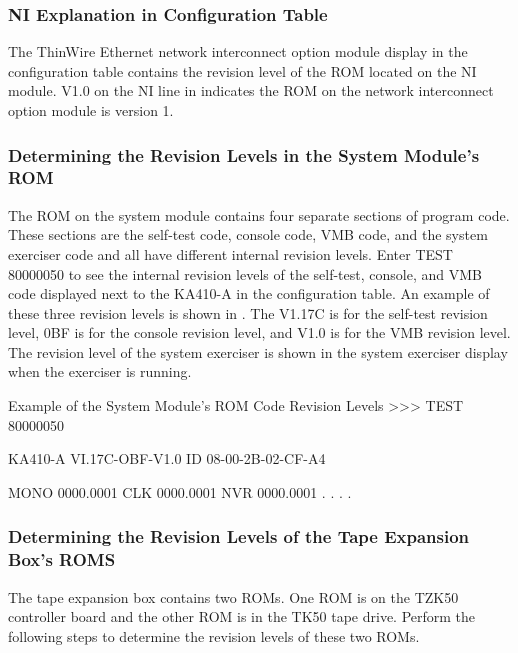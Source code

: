 \newpage

\subsubsection{NI Explanation in Configuration Table}

The ThinWire Ethernet network interconnect option module display in the
configuration table contains the revision level of the ROM located on the
NI module. V1.0 on the NI line in  indicates the ROM on the
network interconnect option module is version 1.

\subsubsection{Determining the Revision Levels in the System Module's ROM}

The ROM on the system module contains four separate sections of program 
code. These sections are the self-test code, console code, VMB code,
and the system exerciser code and all have different internal revision levels. 
Enter TEST 80000050 to see the internal revision levels of the self-test,
console, and VMB code displayed next to the KA410-A in the configuration
table. An example of these three revision levels is shown in .
The V1.17C is for the self-test revision level, 0BF is for the console revision
level, and V1.0 is for the VMB revision level. The revision level of the system 
exerciser is shown in the system exerciser display when the exerciser
is running.

\begin{ttfig}{Example of the System Module's ROM Code Revision Levels}
>>> TEST 80000050

KA410-A VI.17C-OBF-V1.0
ID 08-00-2B-02-CF-A4

  MONO       0000.0001
  CLK        0000.0001
  NVR        0000.0001
   .
   .
   .
   .
\end{ttfig}

\newpage

\subsubsection{Determining the Revision Levels of the Tape Expansion Box's ROMS}

The tape expansion box contains two ROMs. One ROM is on the TZK50
controller board and the other ROM is in the TK50 tape drive. Perform the
following steps to determine the revision levels of these two ROMs.

